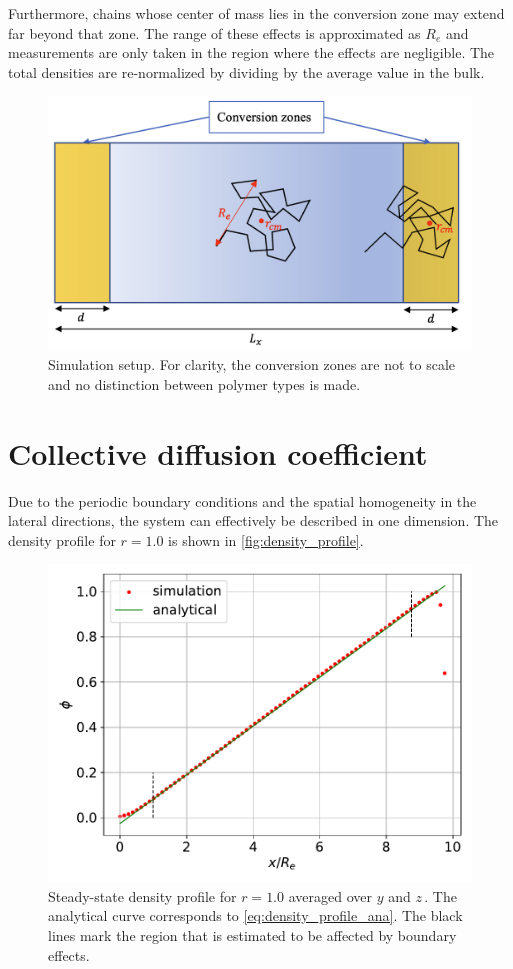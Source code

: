 \documentclass[bachelor,       %
               oneside,        %
               BCOR10mm,       %
               ngerman, english %
               ]{GAUBM}
\begin{document}
Furthermore, chains whose center of mass lies in the conversion zone may extend far beyond that zone. The range of these effects is approximated as $R_e$ and measurements are only taken in the region where the effects are negligible. The total densities are re-normalized by dividing by the average value in the bulk.


\begin{figure}[h]
  \centering
  \includegraphics[width=0.7\linewidth]{figures/simulation_box.png}
  \caption{Simulation setup. For clarity, the conversion zones are not to scale and no distinction between polymer types is made.}
  \label{fig:simulation_box}
\end{figure}


\section{Collective diffusion coefficient}
\label{sec:colldiff}

Due to the periodic boundary conditions and the spatial homogeneity in the lateral directions, the system can effectively be described in one dimension. The density profile for $r=1.0$ is shown in \autoref{fig:density_profile}.

\begin{figure}[h]
  \centering
  \includegraphics[width=0.6\linewidth]{figures/density_coll_diff.pdf}
  \caption{Steady-state density profile for $r=1.0$ averaged over $y$ and $z\,$. The analytical curve corresponds to \autoref{eq:density_profile_ana}. The black lines mark the region that is estimated to be affected by boundary effects.}
  \label{fig:density_profile}
\end{figure}
\end{document}
